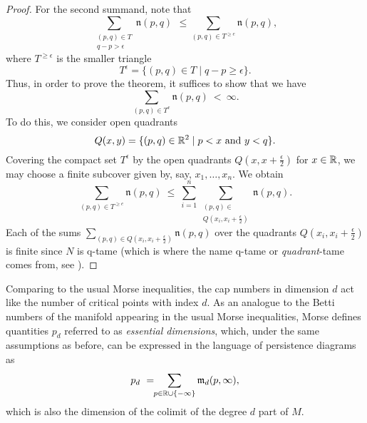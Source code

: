 \begin{proof}
    For the second summand, note that  
    \begin{equation*}
    \sum_{ \substack{ (p,q) \in T \\ q-p > \epsilon } } \mathfrak{n} (p,q)
    \ \, \leq \!\!
    \sum_{(p,q) \in T^{\geq e}} \mathfrak{n} (p,q),
    \end{equation*}
    where $T^{\geq \epsilon}$ is the smaller triangle 
    \begin{equation*}
    T^{\epsilon} = \{(p,q) \in T \mid q-p \geq \epsilon\}.
    \end{equation*}
    Thus, in order to prove the theorem, it suffices to show that we have 
    \begin{equation*}
    \sum_{(p,q) \in T^{e}} \mathfrak{n} (p,q) 
    \ < \ 
    \infty.
    \end{equation*}
    To do this, we consider open quadrants 
    \begin{equation*}
    Q(x, y) = \{ (p, q) \in \mathbb{R}^2 \mid p < x \text{ and } y < q \}.
    \end{equation*}
    Covering the compact set $T^{\epsilon}$ by the open quadrants $Q \left(x, x + \frac{\epsilon}{2} \right)$ for $x \in \mathbb{R}$, we may choose a finite subcover given by, say, $x_1,\dots, x_n$.
	We obtain
    \begin{equation*}
    \sum_{(p,q) \in T^{\geq e}} \mathfrak{n} (p,q) 
    \ \leq \
    \sum_{i=1}^n \sum_{\substack{(p, q) \in \\ Q (x_i, x_i + \frac{\epsilon}{2})}} \mathfrak{n}(p,q).
    \end{equation*}
    Each of the sums $\sum_{(p,q) \in Q \left(x_i, x_i + \frac{\epsilon}{2} \right)} \mathfrak{n}(p,q)$ over the quadrants $Q \left(x_i, x_i + \frac{\epsilon}{2} \right)$ is finite since $N$ is q-tame (which is where the name q-tame or \emph{quadrant}-tame comes from, see \cite[Section 3.8]{Chazal.2016a}).
\end{proof}

Comparing to the usual Morse inequalities, the cap numbers in dimension $d$ act like the number of critical points with index $d$.
As an analogue to the Betti numbers of the manifold appearing in the usual Morse inequalities, Morse defines quantities $p_{d}$ referred to as \emph{essential dimensions}, which, under the same assumptions as before, can be expressed in the language of persistence diagrams as
\begin{equation} \label{e:essential dimension}
p_{d} \ = \!\! \sum_{p \in \mathbb{R} \cup \{-\infty\}} \mathfrak{m}_d(p,\infty),
\end{equation}
which is also the dimension of the colimit of the degree $d$ part of $M$.

